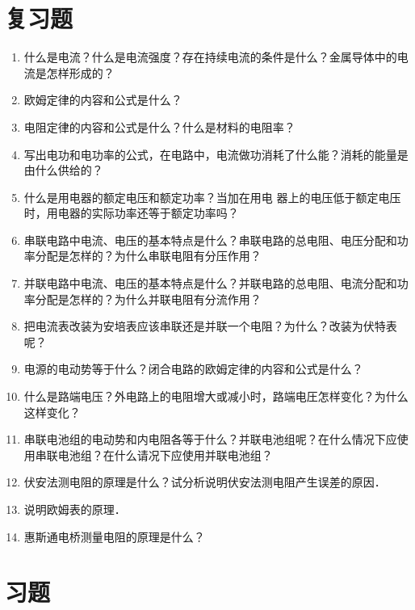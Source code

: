 \section*{复习题}
\begin{enumerate}
    \item 什么是电流？什么是电流强度？存在持续电流的条件是什么？金属导体中的电流是怎样形成的？
    \item 欧姆定律的内容和公式是什么？
    \item 电阻定律的内容和公式是什么？什么是材料的电阻率？
    \item 写出电功和电功率的公式，在电路中，电流做功消耗了什么能？消耗的能量是由什么供给的？
    \item 什么是用电器的额定电压和额定功率？当加在用电
    器上的电压低于额定电压时，用电器的实际功率还等于额定功率吗？
    \item 串联电路中电流、电压的基本特点是什么？串联电路的总电阻、电压分配和功率分配是怎样的？为什么串联电阻有分压作用？
    \item 并联电路中电流、电压的基本特点是什么？并联电路的总电阻、电流分配和功率分配是怎样的？为什么并联电阻有分流作用？
    \item 把电流表改装为安培表应该串联还是并联一个电阻？为什么？改装为伏特表呢？
    \item 电源的电动势等于什么？闭合电路的欧姆定律的内容和公式是什么？
\item 什么是路端电压？外电路上的电阻增大或减小时，路端电圧怎样变化？为什么这样变化？
\item 串联电池组的电动势和内电阻各等于什么？并联电池组呢？在什么情况下应使用串联电池组？在什么请况下应使用并联电池组？
\item 伏安法测电阻的原理是什么？试分析说明伏安法测电阻产生误差的原因．
\item 说明欧姆表的原理．
\item 惠斯通电桥测量电阻的原理是什么？
\end{enumerate}


\section*{习题}

